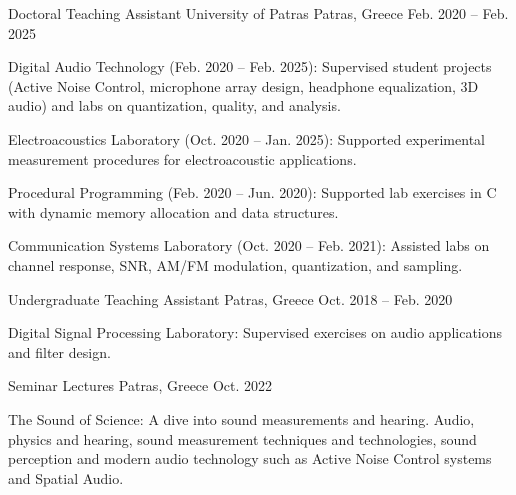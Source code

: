 

\begin{cventries}

  \cventry
    {Doctoral Teaching Assistant} %
    {University of Patras} %
    {Patras, Greece} %
    {Feb. 2020 -- Feb. 2025} %
    {
      \begin{cvitems}
        \item {Digital Audio Technology (Feb. 2020 -- Feb. 2025): Supervised student projects (Active Noise Control, microphone array design, headphone equalization, 3D audio) and labs on quantization, quality, and analysis.}
        \item {Electroacoustics Laboratory (Oct. 2020 -- Jan. 2025): Supported experimental measurement procedures for electroacoustic applications.}
        \item {Procedural Programming (Feb. 2020 -- Jun. 2020): Supported lab exercises in C with dynamic memory allocation and data structures.}
        \item {Communication Systems Laboratory (Oct. 2020 -- Feb. 2021): Assisted labs on channel response, SNR, AM/FM modulation, quantization, and sampling.}
      \end{cvitems}
    }

  \vspace{-5mm}
  \cventry
    {Undergraduate Teaching Assistant} %
    {} %
    {Patras, Greece} %
    {Oct. 2018 -- Feb. 2020} %
    {
      \begin{cvitems}
        \item {Digital Signal Processing Laboratory: Supervised exercises on audio applications and filter design.}
      \end{cvitems}
    }

  \vspace{-5mm}
  \cventry
    {Seminar Lectures} %
    {} %
    {Patras, Greece} %
    {Oct. 2022} %
    {
      \begin{cvitems}
        \item {The Sound of Science: A dive into sound measurements and hearing. Audio, physics and hearing, sound measurement techniques and technologies,
sound perception and modern audio technology such as Active Noise Control systems and Spatial Audio.}
      \end{cvitems}
    }

\end{cventries}

